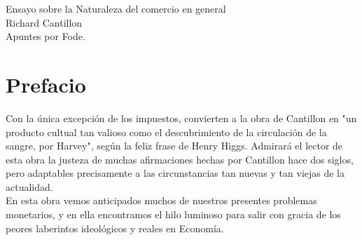\documentclass[10pt]{article}
\begin{document}
\begin{center}
\huge Ensayo sobre la Naturaleza del comercio en general\\
\vspace*{0.5cm}
\large Richard Cantillon\\
\vspace{1cm}
\Large Apuntes por Fode.
\vspace{1.5cm}
\end{center}


\section{Prefacio}
Con la única excepción de los impuestos, convierten a la obra de Cantillon en "un producto cultual tan valioso como el descubrimiento de la circulación de la sangre, por Harvey", según la feliz frase de Henry Higgs. Admirará el lector de esta obra la justeza de muchas afirmaciones hechas por Cantillon hace dos siglos, pero adaptables precisamente a las circunstancias tan nuevas y tan viejas de la actualidad.\\
En esta obra vemos anticipados muchos de nuestros presentes problemas monetarios, y en ella encontramos el hilo luminoso para salir con gracia de los peores laberintos ideológicos y reales en Economía.
\end{document}
